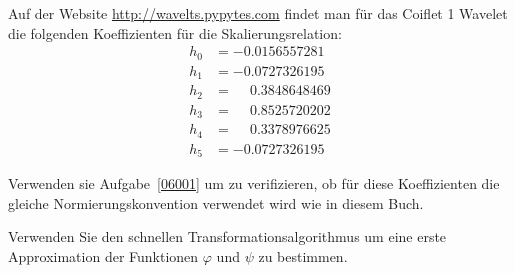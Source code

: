 Auf der Website \url{http://wavelts.pypytes.com} findet man für das
Coiflet 1 Wavelet die folgenden Koeffizienten für die Skalierungsrelation:
\begin{align*}
h_0 &= -0.0156557281\\
h_1 &= -0.0727326195\\
h_2 &= \phantom{-} 0.3848648469\\
h_3 &= \phantom{-} 0.8525720202\\
h_4 &= \phantom{-} 0.3378976625\\
h_5 &= -0.0727326195
\end{align*}
\begin{teilaufgaben}
\item
Verwenden sie Aufgabe~\ref{06001} um zu verifizieren, ob für diese
Koeffizienten die gleiche Normierungskonvention verwendet wird wie in
diesem Buch.
\item
Verwenden Sie den schnellen Transformationsalgorithmus um eine 
erste Approximation der Funktionen $\varphi$ und $\psi$ zu bestimmen.
\end{teilaufgaben}

